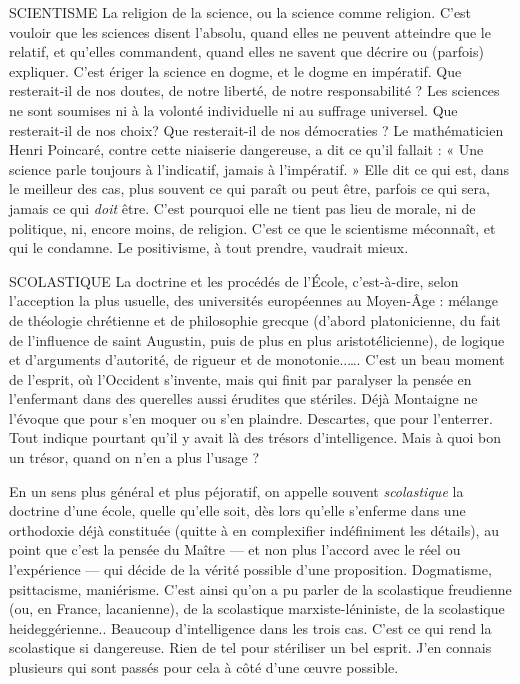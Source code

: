 SCIENTISME La religion de la science, ou la science comme religion. C’est
vouloir que les sciences disent l'absolu, quand elles ne peuvent
atteindre que le relatif, et qu’elles commandent, quand elles ne savent que
décrire ou (parfois) expliquer. C’est ériger la science en dogme, et le dogme en
impératif. Que resterait-il de nos doutes, de notre liberté, de notre
responsabilité ? Les sciences ne sont soumises ni à la volonté individuelle ni au
suffrage universel. Que resterait-il de nos choix? Que resterait-il de nos
démocraties ? Le mathématicien Henri Poincaré, contre cette niaiserie dangereuse,
a dit ce qu’il fallait : « Une science parle toujours à l'indicatif, jamais à
l'impératif. » Elle dit ce qui est, dans le meilleur des cas, plus souvent ce qui
paraît ou peut être, parfois ce qui sera, jamais ce qui {\it doit} être. C’est pourquoi
elle ne tient pas lieu de morale, ni de politique, ni, encore moins, de religion.
C’est ce que le scientisme méconnaît, et qui le condamne. Le positivisme, à
tout prendre, vaudrait mieux.

SCOLASTIQUE La doctrine et les procédés de l’École, c’est-à-dire, selon l’acception
la plus usuelle, des universités européennes au
Moyen-Âge : mélange de théologie chrétienne et de philosophie grecque
(d’abord platonicienne, du fait de l'influence de saint Augustin, puis de plus en
plus aristotélicienne), de logique et d'arguments d’autorité, de rigueur et de
monotonie..…. C’est un beau moment de l’esprit, où l'Occident s’invente, mais
qui finit par paralyser la pensée en l’enfermant dans des querelles aussi érudites
que stériles. Déjà Montaigne ne l’évoque que pour s’en moquer ou s’en
plaindre. Descartes, que pour l’enterrer. Tout indique pourtant qu’il y avait là
des trésors d’intelligence. Mais à quoi bon un trésor, quand on n’en a plus
l'usage ?

En un sens plus général et plus péjoratif, on appelle souvent {\it scolastique} la
doctrine d’une école, quelle qu’elle soit, dès lors qu’elle s’enferme dans une
orthodoxie déjà constituée (quitte à en complexifier indéfiniment les détails),
au point que c’est la pensée du Maître — et non plus l’accord avec le réel ou
l'expérience — qui décide de la vérité possible d’une proposition. Dogmatisme,
psittacisme, maniérisme. C’est ainsi qu’on a pu parler de la scolastique freudienne
(ou, en France, lacanienne), de la scolastique marxiste-léniniste, de la
scolastique heideggérienne.. Beaucoup d'intelligence dans les trois cas. C’est
ce qui rend la scolastique si dangereuse. Rien de tel pour stériliser un bel esprit.
J'en connais plusieurs qui sont passés pour cela à côté d’une œuvre possible.


